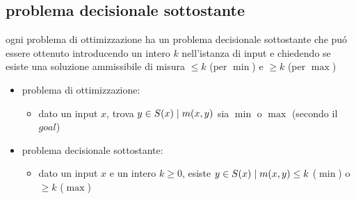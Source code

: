 \subsection*{problema decisionale sottostante}
\begin{flushleft}
	ogni problema di ottimizzazione ha un problema decisionale sottostante che pu\'o essere ottenuto introducendo un intero $k$ nell'istanza di input e chiedendo se esiste una soluzione ammissibile di misura $\leq k$ (per $\min$) e $\geq k$ (per $\max$)
	\begin{itemize}
		\item problema di ottimizzazione:
		\begin{itemize}
			\item dato un input $x$, trova $y\in S(x)\hspace{0.1cm}\vert\hspace{0.1cm}m(x,y)$ sia $\min$ o $\max$ (secondo il $goal$)
		\end{itemize}
		\item problema decisionale sottostante:
		\begin{itemize}
			\item dato un input $x$ e un intero $k\geq 0$, esiste $y\in S(x)\hspace{0.1cm}\vert\hspace{0.1cm}m(x,y)\leq k$ ($\min$) o $\geq k$ ($\max$)
		\end{itemize}
	\end{itemize}
\end{flushleft}


